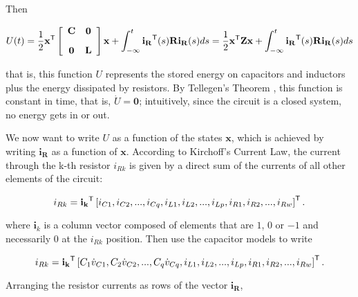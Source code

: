 	Then

\begin{equation} U(t) = \dfrac{1}{2} \mathbf{x}^{\mathsf{T}}\left[\begin{array}{cc} \mathbf{C} & \mathbf{0} \\[3mm] \mathbf{0} & \mathbf{L} \end{array}\right]\mathbf{x} + \int_{-\infty}^{t} \mathbf{i_R}^{\mathsf{T}} (s) \mathbf{R} \mathbf{i_R}(s)ds = \dfrac{1}{2} \mathbf{x}^{\mathsf{T}}\mathbf{Z}\mathbf{x} + \int_{-\infty}^{t} \mathbf{i_R}^{\mathsf{T}} (s) \mathbf{R} \mathbf{i_R}(s)ds \end{equation}

	\noindent that is, this function $U$ represents the stored energy on capacitors and inductors plus the energy dissipated by resistors. By Tellegen's Theorem \cite{desoerBasicCircuitTheory1987}, this function is constant in time, that is, $\dot{U} = \mathbf{0}$; intuitively, since the circuit is a closed system, no energy gets in or out. 

	We now want to write $U$ as a function of the states $\mathbf{x}$, which is achieved by writing $\mathbf{i_R}$ as a function of $\mathbf{x}$. According to Kirchoff's Current Law, the current through the k-th resistor $i_{Rk}$ is given by a direct sum of the currents of all other elements of the circuit:

\begin{equation} i_{Rk} = \mathbf{i_k}^{\mathsf{T}} \left[i_{C1},i_{C2},...,i_{Cq},i_{L1},i_{L2},...,i_{Lp},i_{R1},i_{R2},...,i_{Rw}\right]^{\mathsf{T}}. \end{equation}

	where $\mathbf{i}_k$ is a column vector composed of elements that are $1$, $0$ or $-1$ and necessarily $0$ at the $i_{Rk}$ position. Then use the capacitor models to write

\begin{equation} i_{Rk} = \mathbf{i_k}^{\mathsf{T}} \left[C_1\dot{v}_{C1},C_2\dot{v}_{C2},...,C_q\dot{v}_{Cq},i_{L1},i_{L2},...,i_{Lp},i_{R1},i_{R2},...,i_{Rw}\right]^{\mathsf{T}} .\end{equation}

	Arranging the resistor currents as rows of the vector $\mathbf{i_R}$,

